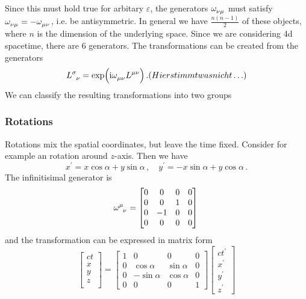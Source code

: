 Since this must hold true for arbitary $\varepsilon$, the generators
$\tensor{\omega}{_\nu_\mu}$ must satisfy
$\tensor{\omega}{_\nu_\mu}=-\tensor{\omega}{_\mu_\nu}$, i.e. be antisymmetric.
In general we have $\frac{n(n-1)}{2}$ of these objects, where $n$ is the
dimension of the underlying space.
Since we are considering 4d spacetime, there are $6$ generators.
The transformations can be created from the generators
\begin{equation}
    \tensor{L}{^\sigma_\nu}=\exp\left(\imI\tensor{\omega}{_\mu_\nu}\tensor{L}{^\mu^\nu}\right)\,.(Hier
    stimmt was nicht\ldots)
\end{equation}
We can
classify the resulting transformations into two groups
\subsubsection{Rotations}
Rotations mix the spatial coordinates, but leave the time fixed. Consider for
example an rotation around $z$-axis. Then we have
\begin{equation}
    x^\prime=x\cos\alpha+y\sin\alpha \, ,\quad y^\prime=-x\sin\alpha+y\cos\alpha \, .
\end{equation}
The infinitisimal generator is
\begin{equation}
    \tensor{\omega}{^\mu_\nu}
    =
    \begin{bmatrix}
        0&0 & 0&0\\
        0&0 &1&0\\
        0&-1&0 &0\\
        0&0 &0 &0
    \end{bmatrix}\,
\end{equation}
and the transformation can be expressed in matrix form
\begin{equation}
    \begin{bmatrix}
        ct\\
        x\\
        y\\
        z\\
    \end{bmatrix}=
    \begin{bmatrix}
        1&0 & 0&0\\
        0&\cos\alpha &\sin\alpha&0\\
        0&-\sin\alpha&\cos\alpha &0\\
        0&0 &0 &1
    \end{bmatrix}
    \begin{bmatrix}
        ct^\prime\\
        x^\prime\\
        y^\prime\\
        z^\prime
    \end{bmatrix}
\end{equation}

